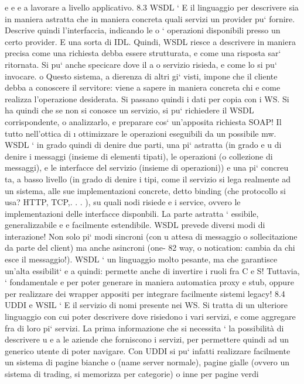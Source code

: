 \documentclass[a4paper,12pt]{article}
\begin{document}
e
e
e
a lavorare a livello applicativo.
8.3
WSDL
`
E il linguaggio per descrivere sia in maniera astratta che in maniera concreta
quali servizi un provider pu` fornire. Descrive quindi l'interfaccia, indicando le
o
`
operazioni disponibili presso un certo provider. E una sorta di IDL. Quindi,
WSDL riesce a descrivere in maniera precisa come una richiesta debba essere
strutturata, e come una risposta sar` ritornata. Si pu` anche specicare dove il
a
o
servizio risieda, e come lo si pu` invocare.
o
Questo sistema, a dierenza di altri gi` visti, impone che il cliente debba
a
conoscere il servitore: viene a sapere in maniera concreta chi e come realizza
l'operazione desiderata. Si passano quindi i dati per copia con i WS. Si ha quindi che se non si conosce un servizio, si
pu` richiedere il WSDL corrispondente,
o
analizzarlo, e preparare cos` un'apposita richiesta SOAP! Il tutto nell'ottica di
\i{}
ottimizzare le operazioni eseguibili da un possibile mw.
WSDL ` in grado quindi di denire due parti, una pi` astratta (in grado
e
u
di denire i messaggi (insieme di elementi tipati), le operazioni (o collezione di
messaggi), e le interfacce del servizio (insieme di operazioni)) e una pi` concreu
ta, a basso livello (in grado di denire i tipi, come il servizio si lega realmente
ad un sistema, alle sue implementazioni concrete, detto binding (che protocollo
si usa? HTTP, TCP,. . . ), su quali nodi risiede e i service, ovvero le implementazioni delle interfacce disponbili. La
parte astratta ` essibile, generalizzabile
e
e facilmente estendibile.
WSDL prevede diversi modi di interazione! Non solo pi` modi sincroni (con
u
attesa di messaggio o sollecitazione da parte del client) ma anche asincroni (one-
82
way, o notication: cambia da chi esce il messaggio!).
WSDL ` un linguaggio molto pesante, ma che garantisce un'alta essibilit`
e
a
quindi: permette anche di invertire i ruoli fra C e S! Tuttavia, ` fondamentale
e
per poter generare in maniera automatica proxy e stub, oppure per realizzare
dei wrapper appositi per integrare facilmente sistemi legacy!
8.4
UDDI e WSIL
`
E il servizio di nomi presente nei WS. Si tratta di un ulteriore linguaggio con
cui poter descrivere dove risiedono i vari servizi, e come aggregare fra di loro
pi` servizi. La prima informazione che si necessita ` la possibilità di descrivere
u
e
a
le aziende che forniscono i servizi, per permettere quindi ad un generico utente
di poter navigare.
Con UDDI si pu` infatti realizzare facilmente un sistema di pagine bianche
o
(name server normale), pagine gialle (ovvero un sistema di trading, si memorizza per categorie) o inne per pagine verdi
\end{document}
